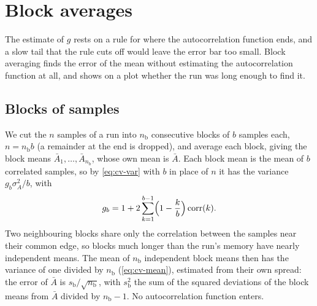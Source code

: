 \section{Block averages}
\label{sec:cv-blocks}

The estimate of $g$ rests on a rule for where the autocorrelation function
ends, and a slow tail that the rule cuts off would leave the error bar too
small. Block averaging finds the error of the mean without estimating the
autocorrelation function at all, and shows on a plot whether the run was
long enough to find it\cite{Flyvbjerg1989}.

\subsection*{Blocks of samples}

We cut the $n$ samples of a run into $n_{\mathrm b}$ consecutive blocks of
$b$ samples each, $n = n_{\mathrm b}b$ (a remainder at the end is dropped),
and average each block, giving the block means $\bar A_1, \dots, \bar
A_{n_{\mathrm b}}$, whose own mean is $\bar A$. Each block mean is the mean of
$b$ correlated samples, so by \cref{eq:cv-var} with $b$ in place of $n$ it
has the variance $g_b\sigma_A^2/b$, with
\begin{equation*}
   g_b = 1 + 2\sum_{k=1}^{b-1}\Bigl(1 - \frac kb\Bigr)
   \operatorname{corr}(k) .
\end{equation*}
Two neighbouring blocks share only the correlation between the samples
near their common edge, so blocks much longer than the run's memory have
nearly independent means. The mean of $n_{\mathrm b}$ independent block
means then has the variance of one divided by $n_{\mathrm b}$
(\cref{eq:cv-mean}), estimated from their own spread: the error of $\bar
A$ is $s_{\mathrm b}/\sqrt{n_{\mathrm b}}$, with $s_{\mathrm b}^2$ the sum of
the squared deviations of the block means from $\bar A$ divided by
$n_{\mathrm b} - 1$. No autocorrelation function enters.

